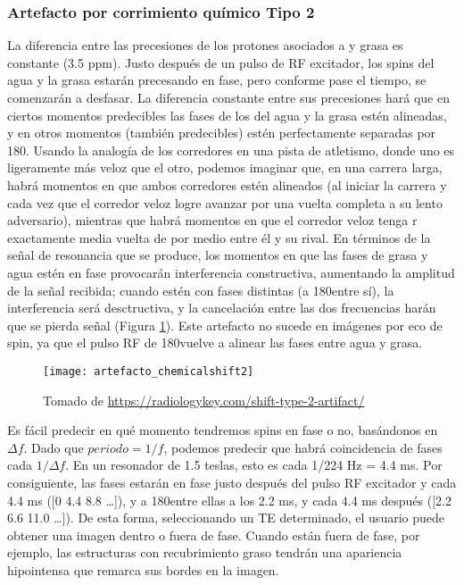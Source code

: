 \subsubsection{Artefacto por corrimiento químico Tipo 2}
La diferencia entre las precesiones de los protones asociados a  y grasa es constante (3.5 ppm). Justo después de un pulso de RF excitador, los spins del agua y la grasa estarán precesando en fase, pero conforme pase el tiempo, se comenzarán a desfasar. La diferencia constante entre sus precesiones hará que en ciertos momentos predecibles las fases de los  del agua y la grasa estén alineadas, y en otros momentos (también predecibles) estén perfectamente separadas por 180\degrees. Usando la analogía de los corredores en una pista de atletismo, donde uno es ligeramente más veloz que el otro, podemos imaginar que, en una carrera larga, habrá momentos en que ambos corredores estén alineados (al iniciar la carrera y cada vez que el corredor veloz logre avanzar por una vuelta completa a su lento adversario), mientras que habrá momentos en que el corredor veloz tenga r exactamente media vuelta de por medio entre él y su rival. En términos de la señal de resonancia que se produce, los momentos en que las fases de grasa y agua estén en fase provocarán interferencia constructiva, aumentando la amplitud de la señal recibida; cuando estén con fases distintas (a 180\degrees entre sí), la interferencia será desctructiva, y la cancelación entre las dos frecuencias harán que se pierda señal (Figura \ref{fig:artefacto_chemicalshift2}). Este artefacto no sucede en imágenes por eco de spin, ya que el pulso RF de 180\degrees vuelve a alinear las fases entre agua y grasa. 



\begin{figure}[htb]
 \begin{figg}
   \texttt{[image: artefacto\_chemicalshift2]}
   \caption{\figurapendiente Tomado de \url{https://radiologykey.com/shift-type-2-artifact/}}
 \label{fig:artefacto_chemicalshift2}
 \end{figg}
\end{figure}

Es fácil predecir en qué momento tendremos spins en fase o no, basándonos en $\Delta f$. Dado que $periodo = 1/f$, podemos predecir que habrá coincidencia de fases cada $1/\Delta f$. En un resonador de 1.5 teslas, esto es cada 1/224 Hz =  4.4 ms. Por consiguiente, las fases estarán en fase justo después del pulso RF excitador y cada 4.4 ms ([0 4.4 8.8 \ldots]), y a 180\degrees entre ellas a los 2.2 ms, y cada 4.4 ms después ([2.2 6.6 11.0 \ldots]). De esta forma, seleccionando un TE determinado, el usuario puede obtener una imagen dentro o fuera de fase. Cuando están fuera de fase, por ejemplo, las estructuras con recubrimiento graso tendrán una apariencia hipointensa que remarca sus bordes en la imagen.

